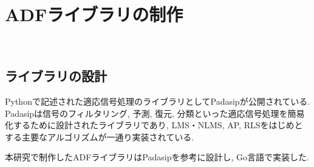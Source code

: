 







\newpage

\section{ADFライブラリの制作}\label{create-adflib}

\
\subsection{ライブラリの設計}\label{design-adf}

Pythonで記述された適応信号処理のライブラリとしてPadasip\cite{padasip}が公開されている. Padasipは信号のフィルタリング, 予測, 復元, 分類といった適応信号処理を簡易化するために設計されたライブラリであり, LMS・NLMS, AP, RLSをはじめとする主要なアルゴリズムが一通り実装されている. 

本研究で制作したADFライブラリはPadasipを参考に設計し, Go言語で実装した. 

